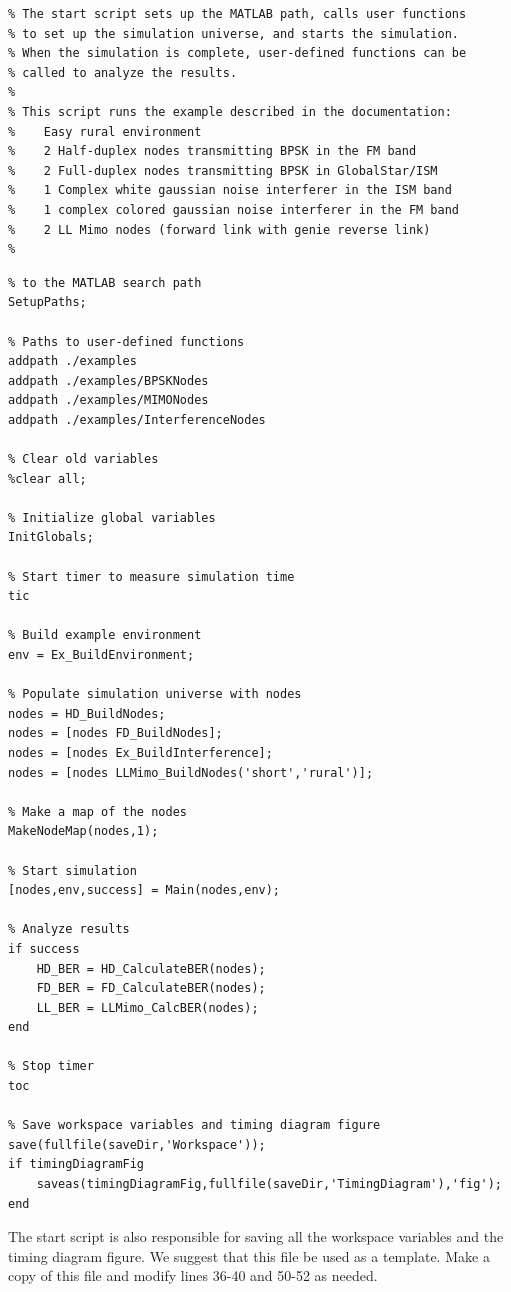 \begin{lstlisting}[name=startExample]
% Script StartExample.m:
% The start script sets up the MATLAB path, calls user functions
% to set up the simulation universe, and starts the simulation.
% When the simulation is complete, user-defined functions can be
% called to analyze the results.
%
% This script runs the example described in the documentation:
%    Easy rural environment
%    2 Half-duplex nodes transmitting BPSK in the FM band
%    2 Full-duplex nodes transmitting BPSK in GlobalStar/ISM
%    1 Complex white gaussian noise interferer in the ISM band
%    1 complex colored gaussian noise interferer in the FM band
%    2 LL Mimo nodes (forward link with genie reverse link)
%
\end{lstlisting}
\begin{lstlisting}[name=startExample,firstnumber=21]
% Add required directories containing simulator functions
% to the MATLAB search path
SetupPaths;

% Paths to user-defined functions
addpath ./examples
addpath ./examples/BPSKNodes
addpath ./examples/MIMONodes
addpath ./examples/InterferenceNodes

% Clear old variables
%clear all;

% Initialize global variables
InitGlobals;

% Start timer to measure simulation time
tic

% Build example environment
env = Ex_BuildEnvironment;

% Populate simulation universe with nodes
nodes = HD_BuildNodes;
nodes = [nodes FD_BuildNodes];
nodes = [nodes Ex_BuildInterference];
nodes = [nodes LLMimo_BuildNodes('short','rural')];

% Make a map of the nodes
MakeNodeMap(nodes,1);

% Start simulation
[nodes,env,success] = Main(nodes,env);

% Analyze results
if success
    HD_BER = HD_CalculateBER(nodes);
    FD_BER = FD_CalculateBER(nodes);
    LL_BER = LLMimo_CalcBER(nodes);
end

% Stop timer
toc

% Save workspace variables and timing diagram figure
save(fullfile(saveDir,'Workspace'));
if timingDiagramFig
    saveas(timingDiagramFig,fullfile(saveDir,'TimingDiagram'),'fig');
end
\end{lstlisting}

The start script is also responsible for saving all the workspace
variables and the timing diagram figure.  We suggest that this file
be used as a template.  Make a copy of this file and modify lines
36-40 and 50-52 as needed.


